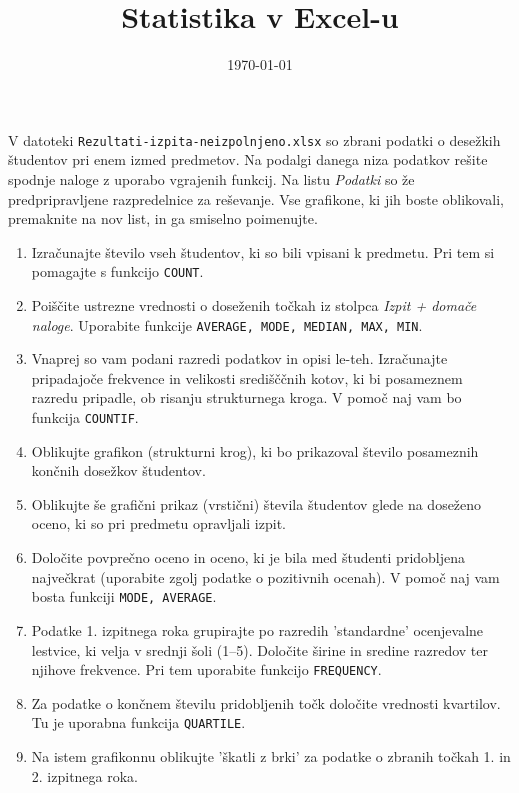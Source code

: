 \documentclass[12pt,a4paper]{article}
\title{Statistika v Excel-u}
\author{}
\date{\today}
\newcommand{\code}{\texttt}
\begin{document}
\maketitle

V datoteki \code{Rezultati-izpita-neizpolnjeno.xlsx} so zbrani podatki o desežkih študentov pri enem izmed predmetov. 
Na podalgi danega niza podatkov rešite spodnje naloge z uporabo vgrajenih funkcij. Na listu \textit{Podatki} so že predpripravljene razpredelnice za reševanje. 
Vse grafikone, ki jih boste oblikovali, premaknite na nov list, in ga smiselno poimenujte.

\begin{enumerate}
    \item Izračunajte število vseh študentov, ki so bili vpisani k predmetu. Pri tem si pomagajte s funkcijo \code{COUNT}.
    \item Poiščite ustrezne vrednosti o doseženih točkah iz stolpca \textit{Izpit + domače naloge}. Uporabite funkcije \code{AVERAGE, MODE, MEDIAN, MAX, MIN}.
    \item Vnaprej so vam podani razredi podatkov in opisi le-teh. Izračunajte pripadajoče frekvence in velikosti središččnih kotov, ki bi posameznem razredu pripadle, ob risanju strukturnega kroga. V pomoč naj  vam bo funkcija \code{COUNTIF}.
    \item Oblikujte grafikon (strukturni krog), ki bo prikazoval število posameznih končnih dosežkov študentov.
    \item Oblikujte še grafični prikaz (vrstični) števila študentov glede na doseženo oceno, ki so pri predmetu opravljali izpit.
    \item Določite povprečno oceno in oceno, ki je bila med študenti pridobljena največkrat (uporabite zgolj podatke o pozitivnih ocenah). V pomoč naj vam bosta funkciji \code{MODE, AVERAGE}.
    \item Podatke 1. izpitnega roka grupirajte po razredih 'standardne' ocenjevalne lestvice, ki velja v srednji šoli (1--5). Določite širine in sredine razredov ter njihove frekvence. Pri tem uporabite funkcijo \code{FREQUENCY}.
    \item Za podatke o končnem številu pridobljenih točk določite vrednosti kvartilov. Tu je uporabna funkcija \code{QUARTILE}.
    \item Na istem grafikonnu oblikujte 'škatli z brki' za podatke o zbranih točkah 1. in 2. izpitnega roka.
\end{enumerate}
\end{document}
